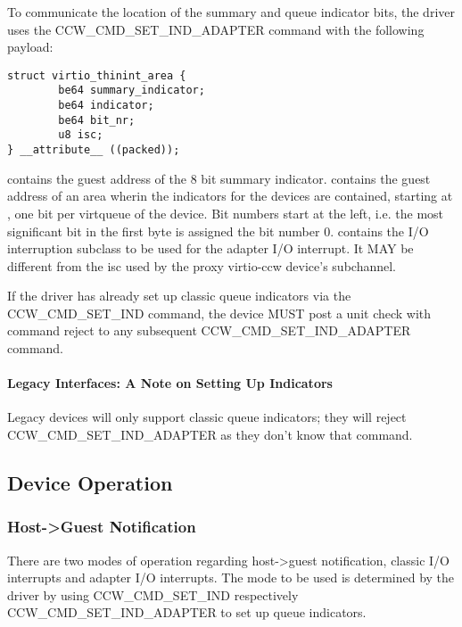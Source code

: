 To communicate the location of the summary and queue indicator bits,
the driver uses the CCW_CMD_SET_IND_ADAPTER command with the following
payload:

\begin{lstlisting}
struct virtio_thinint_area {
        be64 summary_indicator;
        be64 indicator;
        be64 bit_nr;
        u8 isc;
} __attribute__ ((packed));
\end{lstlisting}

 contains the guest address of the 8 bit summary
indicator.
 contains the guest address of an area wherin the indicators
for the devices are contained, starting at , one bit per
virtqueue of the device. Bit numbers start at the left, i.e. the most
significant bit in the first byte is assigned the bit number 0.
 contains the I/O interruption subclass to be used for the adapter
I/O interrupt. It MAY be different from the isc used by the proxy
virtio-ccw device's subchannel.

If the driver has already set up classic queue indicators via the
CCW_CMD_SET_IND command, the device MUST post a unit check with
command reject to any subsequent CCW_CMD_SET_IND_ADAPTER command.

\paragraph{Legacy Interfaces: A Note on Setting Up Indicators}\label{sec:Virtio Transport Options / Virtio over channel I/O / Device Initialization / Setting Up Indicators / Legacy Interfaces: A Note on Setting Up Indicators}

Legacy devices will only support classic queue indicators; they will
reject CCW_CMD_SET_IND_ADAPTER as they don't know that command.

\subsection{Device Operation}\label{sec:Virtio Transport Options / Virtio over channel I/O / Device Operation}

\subsubsection{Host->Guest Notification}\label{sec:Virtio Transport Options / Virtio over channel I/O / Device Operation / Host->Guest Notification}

There are two modes of operation regarding host->guest notification,
classic I/O interrupts and adapter I/O interrupts. The mode to be
used is determined by the driver by using CCW_CMD_SET_IND respectively
CCW_CMD_SET_IND_ADAPTER to set up queue indicators.

